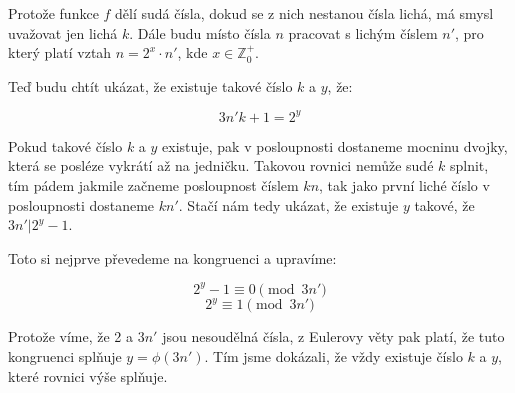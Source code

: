 \documentclass{fkssolpub}
\author{Ondřej Sedláček}
\begin{document}
Protože funkce $f$ dělí sudá čísla, dokud se z nich nestanou čísla lichá, má smysl uvažovat jen lichá $k$. Dále budu místo čísla $n$ pracovat s lichým číslem $n'$, pro který platí vztah $n = 2^x \cdot n'$, kde $x \in \mathbb{Z}_0^{+}$.

Teď budu chtít ukázat, že existuje takové číslo $k$ a $y$, že:

\[
	3 n' k + 1 = 2^y
\]

Pokud takové číslo $k$ a $y$ existuje, pak v posloupnosti dostaneme mocninu dvojky, která se posléze vykrátí až na jedničku. Takovou rovnici nemůže sudé $k$ splnit, tím pádem jakmile začneme posloupnost číslem $kn$, tak jako první liché číslo v posloupnosti dostaneme $k n'$. Stačí nám tedy ukázat, že existuje $y$ takové, že $3 n' \vert 2^y - 1$.

Toto si nejprve převedeme na kongruenci a upravíme:

\[
	2^y - 1 \equiv 0 \pmod{3n'}
\]
\[
	2^y \equiv 1 \pmod{3n'}
\]

Protože víme, že 2 a $3n'$ jsou nesoudělná čísla, z Eulerovy věty pak platí, že tuto kongruenci splňuje $y = \phi(3n')$. Tím jsme dokázali, že vždy existuje číslo $k$ a $y$, které rovnici výše splňuje.
\end{document}
